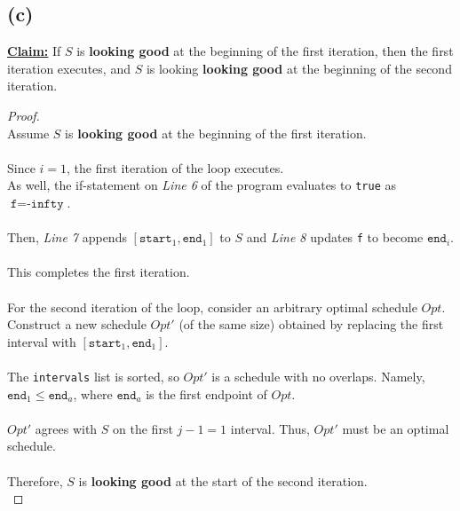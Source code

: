 \documentclass[12pt]{article}
\begin{document}
\subsection*{(c)}
\underline{\textbf{Claim:}} If \( S \) is \textbf{looking good} at the beginning of the first iteration, then the first iteration executes, and \( S \) is looking \textbf{looking good} at the beginning of the second iteration.
\begin{proof}
\leavevmode\\
    Assume \( S \) is \textbf{looking good} at the beginning of the first iteration. \\
    \\
    Since \( i = 1 \), the first iteration of the loop executes. \\
    As well, the if-statement on \textit{Line 6} of the program evaluates to \texttt{true} as \( \texttt{f} = \texttt{-infty} \). \\
    \\
    Then, \textit{Line 7} appends \( [\texttt{start}_1, \texttt{end}_1] \) to \( S \) and \textit{Line 8} updates \texttt{f} to become \( \texttt{end}_i \). \\
    \\
    This completes the first iteration. \\
    \\
    For the second iteration of the loop, consider an arbitrary optimal schedule \( Opt \). Construct a new schedule \( Opt' \) (of the same size) obtained by replacing the first interval with \( [\texttt{start}_1, \texttt{end}_1] \). \\
    \\
    The \texttt{intervals} list is sorted, so \( Opt' \) is a schedule with no overlaps. Namely, \( \texttt{end}_1 \leq \texttt{end}_a \), where \( \texttt{end}_a \) is the first endpoint of \( Opt \). \\
    \\
    \( Opt' \) agrees with \( S \) on the first \( j - 1 = 1 \) interval. Thus, \( Opt' \) must be an optimal schedule. \\
    \\
    Therefore, \( S \) is \textbf{looking good} at the start of the second iteration. \\
\end{proof}
\end{document}
